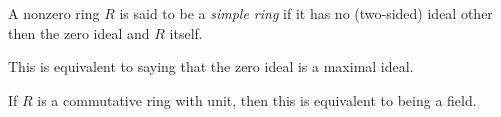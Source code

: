 \documentclass[12pt]{article}
\begin{document}
A nonzero ring $R$ is said to be a {\it simple ring} if it has no (two-sided) ideal other then the zero ideal and $R$ itself.
\par
This is equivalent to saying that the zero ideal is a maximal ideal.
\par
If $R$ is a commutative ring with unit, then this is equivalent to being a field.
\end{document}
